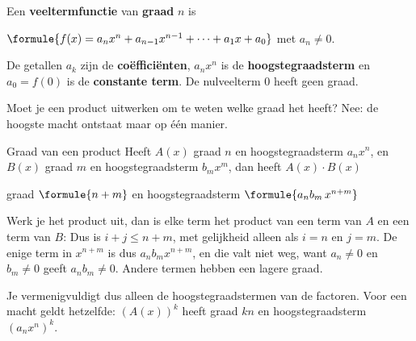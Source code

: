 \begin{theorie}
Een \textbf{\textcolor{accent}{veeltermfunctie}} van \textbf{\textcolor{accent}{graad}} $n$ is

\qquad $\formule{f(x) = a_n x^n + a_{n-1}x^{n-1} + \cdots + a_1 x + a_0}$ \quad met $a_n \neq 0$.

De getallen $a_k$ zijn de \textbf{\textcolor{accent}{coëfficiënten}}, $a_n x^n$ is de \textbf{\textcolor{accent}{hoogstegraadsterm}} en $a_0 = f(0)$ is de \textbf{\textcolor{accent}{constante term}}. De nulveelterm $0$ heeft geen graad.
\end{theorie}

Moet je een product uitwerken om te weten welke graad het heeft? Nee: de hoogste macht ontstaat maar op één manier.

\begin{theorie}
\begin{stelling}{Graad van een product}
Heeft $A(x)$ graad $n$ en hoogstegraadsterm $a_n x^n$, en $B(x)$ graad $m$ en hoogstegraadsterm $b_m x^m$, dan heeft $A(x) \cdot B(x)$

\qquad graad $\formule{n + m}$ \quad en hoogstegraadsterm \quad $\formule{a_n b_m\, x^{n+m}}$
\end{stelling}

\begin{bewijs}
Werk je het product uit, dan is elke term het product van een term van $A$ en een term van $B$:
Dus is $i + j \leqslant n + m$, met gelijkheid alleen als $i = n$ en $j = m$. De enige term in $x^{n+m}$ is dus $a_n b_m x^{n+m}$, en die valt niet weg, want $a_n \neq 0$ en $b_m \neq 0$ geeft $a_n b_m \neq 0$. Andere termen hebben een lagere graad.
\end{bewijs}
\end{theorie}

Je vermenigvuldigt dus alleen de hoogstegraadstermen van de factoren. Voor een macht geldt hetzelfde: $(A(x))^k$ heeft graad $kn$ en hoogstegraadsterm $(a_n x^n)^k$.


